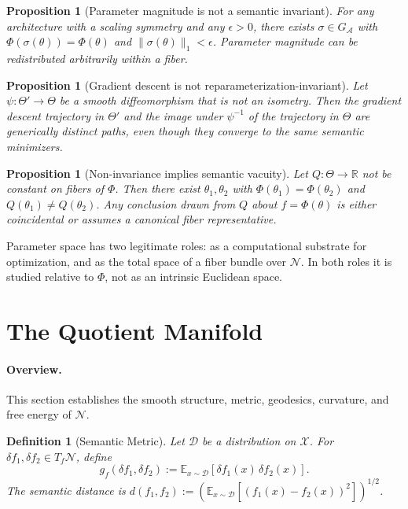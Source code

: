 \documentclass[twocolumn,10pt]{article}
\theoremstyle{thmstyle}
\newtheorem{proposition}[theorem]{Proposition}
\theoremstyle{defstyle}
\newtheorem{definition}[theorem]{Definition}
\begin{document}
\begin{proposition}[Parameter magnitude is not a semantic invariant]
For any architecture with a scaling symmetry and any $\epsilon > 0$,
there exists $\sigma \in G_\mathcal{A}$ with $\Phi(\sigma(\theta)) =
\Phi(\theta)$ and $\|\sigma(\theta)\|_1 < \epsilon$. Parameter magnitude
can be redistributed arbitrarily within a fiber.
\end{proposition}

\begin{proposition}[Gradient descent is not reparameterization-invariant]
Let $\psi : \Theta' \to \Theta$ be a smooth diffeomorphism that is not
an isometry. Then the gradient descent trajectory in $\Theta'$ and the
image under $\psi^{-1}$ of the trajectory in $\Theta$ are generically
distinct paths, even though they converge to the same semantic
minimizers.
\end{proposition}

\begin{proposition}[Non-invariance implies semantic vacuity]
\label{prop:vacuity}
Let $Q : \Theta \to \mathbb{R}$ not be constant on fibers of $\Phi$.
Then there exist $\theta_1, \theta_2$ with $\Phi(\theta_1) =
\Phi(\theta_2)$ and $Q(\theta_1) \neq Q(\theta_2)$. Any conclusion
drawn from $Q$ about $f = \Phi(\theta)$ is either coincidental or
assumes a canonical fiber representative.
\end{proposition}

Parameter space has two legitimate roles: as a computational substrate
for optimization, and as the total space of a fiber bundle over
$\mathcal{N}$. In both roles it is studied relative to $\Phi$, not as
an intrinsic Euclidean space.

\section{The Quotient Manifold}
\label{sec:quotient}

\paragraph{Overview.}
This section establishes the smooth structure, metric, geodesics,
curvature, and free energy of $\mathcal{N}$.

\begin{definition}[Semantic Metric]
\label{def:semantic-metric}
Let $\mathcal{D}$ be a distribution on $\mathcal{X}$. For
$\delta f_1, \delta f_2 \in T_f\mathcal{N}$, define
\[
g_f(\delta f_1,\delta f_2) :=
\mathbb{E}_{x\sim\mathcal{D}}[\delta f_1(x)\,\delta f_2(x)].
\]
The \emph{semantic distance} is
$d(f_1,f_2) := (\mathbb{E}_{x\sim\mathcal{D}}[(f_1(x)-f_2(x))^2])^{1/2}$.
\end{definition}
\end{document}
